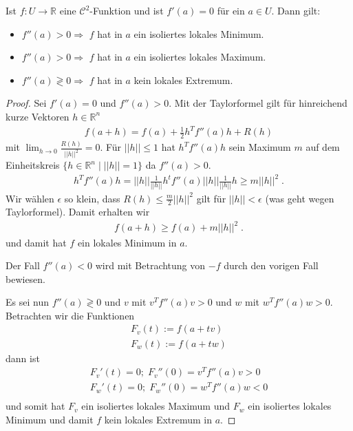 \begin{Satz}
 Ist $f: U  \to \mathbb{R}$ eine $\mathcal{C}^2$-Funktion und ist $f'(a) = 0$ für ein $a \in U$. Dann gilt:
\begin{itemize}
\item $f''(a) > 0 \Rightarrow $ $f$ hat in $a$ ein isoliertes lokales Minimum.
\item $f''(a) > 0 \Rightarrow $ $f$ hat in $a$ ein isoliertes lokales Maximum.
\item $f''(a) \gtrless 0 \Rightarrow $ $f$ hat in $a$ kein lokales Extremum.
\end{itemize} 
\end{Satz}
\begin{proof}
Sei $f'(a) = 0$ und $f''(a) > 0$. Mit der Taylorformel gilt für hinreichend kurze Vektoren $h \in \mathbb{R}^n$
\begin{align*}
f(a + h) = f(a) + \frac{1}{2} h^T f''(a) h + R(h)
\end{align*}
mit $\lim_{h \to 0} \frac{R(h)}{ ||h||^2} = 0$. Für $||h|| \leq 1$ hat $ h^T f''(a) h $ sein Maximum $m$ auf dem Einheitskreis $\{ h \in \mathbb{R}^n \; | \; ||h|| = 1 \}$ da $f''(a) > 0$.
\begin{align*}
 h^T f''(a) h  = ||h|| \frac{1}{||h||} h^t  f''(a)  ||h|| \frac{1}{||h||} h \geq m ||h||^2 \;.
\end{align*}
Wir wählen $\epsilon$ so klein, dass $R(h) \leq \frac{m}{2}  ||h||^2$ gilt für $||h|| < \epsilon$  (was geht wegen Taylorformel).
Damit erhalten wir
\begin{align*}
f(a + h) \geq f(a) +  m ||h||^2 \;.
\end{align*}
und damit hat $f$ ein lokales Minimum in $a$.

Der Fall $f''(a) < 0$ wird mit Betrachtung von $-f$ durch den vorigen Fall bewiesen.

Es sei nun $f''(a) \gtrless 0$ und $v$ mit $v^T f''(a) v > 0$ und $w$ mit $w^T f''(a) w > 0$. Betrachten wir die Funktionen
\begin{align*}
F_v (t) := f(a + tv) \\
F_w(t) := f(a +tw)
\end{align*}
dann ist 
\begin{align*}
F_v' (t) = 0; \; F_v''(0) = v^T f''(a) v > 0 \\
F_w' (t) = 0; \; F_w''(0) = w^T f''(a) w < 0 \\
\end{align*}
und somit hat $F_v$ ein isoliertes lokales Maximum und $F_w$ ein isoliertes lokales Minimum und damit $f$ kein lokales Extremum  in  $a$.
\end{proof}


